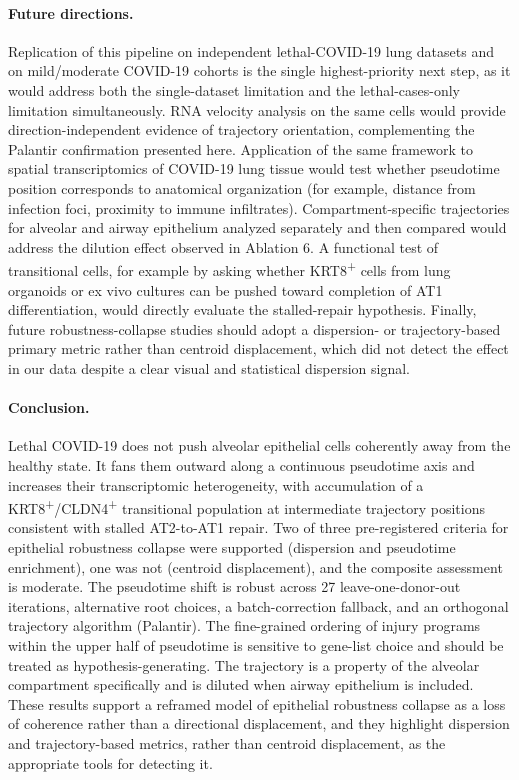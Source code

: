 \documentclass[11pt]{article}
\begin{document}
\paragraph{Future directions.} Replication of this pipeline on independent lethal-COVID-19 lung datasets and on mild/moderate COVID-19 cohorts is the single highest-priority next step, as it would address both the single-dataset limitation and the lethal-cases-only limitation simultaneously. RNA velocity analysis \citep{LaManno2018, Bergen2020} on the same cells would provide direction-independent evidence of trajectory orientation, complementing the Palantir confirmation presented here. Application of the same framework to spatial transcriptomics of COVID-19 lung tissue would test whether pseudotime position corresponds to anatomical organization (for example, distance from infection foci, proximity to immune infiltrates). Compartment-specific trajectories for alveolar and airway epithelium analyzed separately and then compared would address the dilution effect observed in Ablation 6. A functional test of transitional cells, for example by asking whether KRT8\textsuperscript{+} cells from lung organoids or ex vivo cultures can be pushed toward completion of AT1 differentiation, would directly evaluate the stalled-repair hypothesis. Finally, future robustness-collapse studies should adopt a dispersion- or trajectory-based primary metric rather than centroid displacement, which did not detect the effect in our data despite a clear visual and statistical dispersion signal.

\paragraph{Conclusion.} Lethal COVID-19 does not push alveolar epithelial cells coherently away from the healthy state. It fans them outward along a continuous pseudotime axis and increases their transcriptomic heterogeneity, with accumulation of a KRT8\textsuperscript{+}/CLDN4\textsuperscript{+} transitional population at intermediate trajectory positions consistent with stalled AT2-to-AT1 repair. Two of three pre-registered criteria for epithelial robustness collapse were supported (dispersion and pseudotime enrichment), one was not (centroid displacement), and the composite assessment is moderate. The pseudotime shift is robust across 27 leave-one-donor-out iterations, alternative root choices, a batch-correction fallback, and an orthogonal trajectory algorithm (Palantir). The fine-grained ordering of injury programs within the upper half of pseudotime is sensitive to gene-list choice and should be treated as hypothesis-generating. The trajectory is a property of the alveolar compartment specifically and is diluted when airway epithelium is included. These results support a reframed model of epithelial robustness collapse as a loss of coherence rather than a directional displacement, and they highlight dispersion and trajectory-based metrics, rather than centroid displacement, as the appropriate tools for detecting it.
\end{document}

